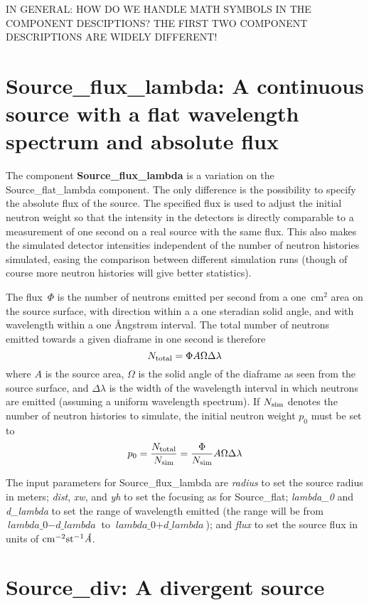 IN GENERAL: HOW DO WE HANDLE MATH SYMBOLS IN THE COMPONENT DESCIPTIONS? THE 
FIRST TWO COMPONENT DESCRIPTIONS ARE WIDELY DIFFERENT!

\section{Source\_flux\_lambda: A continuous source with a flat wavelength spectrum and absolute flux}
\label{Source_flux_lambda}

The component {\bf Source\_flux\_lambda} is a variation on the
Source\_flat\_lambda component. The only difference is the possibility
to specify the absolute flux of the source. The specified flux is used
to adjust the initial neutron weight so that the intensity in the
detectors is directly comparable to a measurement of one second on a
real source with the same flux. This also makes the simulated detector
intensities independent of the number of neutron histories simulated,
easing the comparison between different simulation runs (though of
course more neutron histories will give better statistics).

The flux~$\Phi$ is the number of neutrons emitted per second from a
one~cm$^2$ area on the source surface, with direction within a a one
steradian solid angle, and with wavelength within a one {\AA}ngstr{\o}m
interval. The total number of neutrons emitted towards a given diaframe
in one second is therefore
$$ N_{\rm total} = \Phi A \Omega \Delta\lambda $$
where $A$ is the source area, $\Omega$ is the solid angle of the
diaframe as seen from the source surface, and $\Delta\lambda$ is the
width of the wavelength interval in which neutrons are emitted (assuming
a uniform wavelength spectrum). If $N_{\rm sim}$ denotes the number of
neutron histories to simulate, the initial neutron weight $p_0$ must be set to
$$ p_0 = \frac{N_{\rm total}}{N_{\rm sim}} = 
    \frac{\Phi}{N_{\rm sim}} A \Omega \Delta\lambda $$

The input parameters for Source\_flux\_lambda are \textit{radius} to set
the source radius in meters; \textit{dist}, \textit{xw}, and \textit{yh}
to set the focusing as for Source\_flat; \textit{lambda\_0} and
\textit{d\_lambda} to set the range of wavelength emitted (the range
will be from $\textit{lambda\_0} - \textit{d\_lambda}$ to
$\textit{lambda\_0} + \textit{d\_lambda}$); and \textit{flux} to set the
source flux in units of ${\rm cm}^{-2} {\rm st}^{-1} \textit{\AA}$.


\section{Source\_div: A divergent source}

